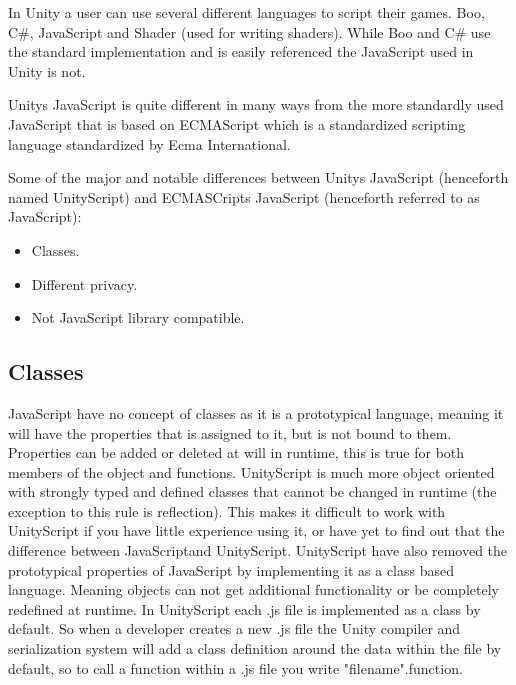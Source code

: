 In Unity a user can use several different languages to script their games. Boo, C\#, JavaScript and Shader (used for writing shaders).
While Boo and C\#  use the standard implementation and is easily referenced the JavaScript used in Unity is not.\cite{WikiScriptVSScript}

Unitys JavaScript is quite different in many ways from the more standardly used JavaScript that is based on ECMAScript\cite{ECMAscipt} which is a standardized scripting
language standardized by Ecma International.

Some of the major and notable differences between Unitys JavaScript (henceforth named UnityScript) and ECMASCripts JavaScript (henceforth referred to as JavaScript):

\begin{itemize}
	\item Classes.
	\item Different privacy.
	\item Not JavaScript library compatible.
\end{itemize}

\subsection {Classes}
JavaScript have no concept of classes as it is a prototypical language, meaning it will have the properties that is assigned to it, but is not bound to them.
Properties can be added or deleted at will in runtime, this is true for both members of the object and functions. UnityScript is much more object oriented with strongly typed and defined classes that cannot be changed in runtime (the exception to this rule is reflection).
This makes it difficult to work with UnityScript if you have little experience using it, or have yet to find out that the difference between JavaScriptand UnityScript.
UnityScript have also removed the prototypical properties of JavaScript by implementing it as a class based language. Meaning objects can not get additional functionality or be completely redefined at runtime. In UnityScript each .js file is implemented as a class by default. So when a developer creates a new .js file the Unity compiler and serialization system will add a class definition around the data within the file by default, so to call a function within a .js file you write "filename".function.

